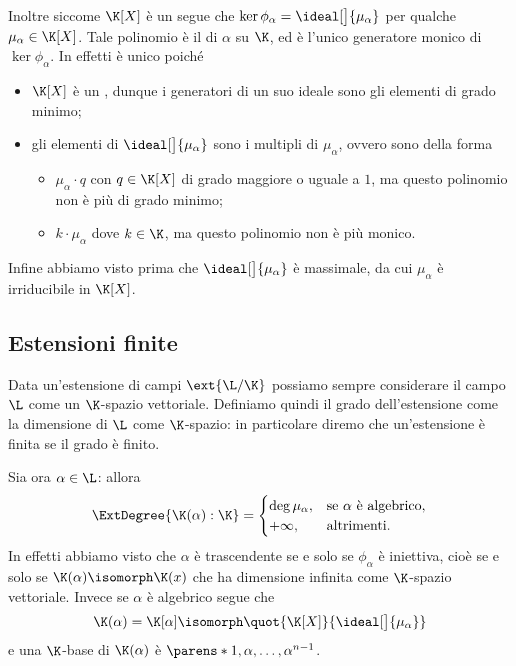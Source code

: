 Inoltre siccome $\K[X]$ è un \PID segue che $\ker \phi_\alpha = \ideal[\big]{\mu_\alpha}$ per qualche $\mu_\alpha \in \K[X]$. Tale polinomio è il  di $\alpha$ su $\K$, ed è l'unico generatore monico di $\ker \phi_\alpha$. In effetti è unico poiché \begin{itemize}
    \item $\K[X]$ è un \ED, dunque i generatori di un suo ideale sono gli elementi di grado minimo;
    \item gli elementi di $\ideal[\big]{\mu_\alpha}$ sono i multipli di $\mu_\alpha$, ovvero sono della forma \begin{itemize}
        \item $\mu_\alpha \cdot q$ con $q \in \K[X]$ di grado maggiore o uguale a $1$, ma questo polinomio non è più di grado minimo;
        \item $k\cdot\mu_\alpha$ dove $k \in \K$, ma questo polinomio non è più monico.   
    \end{itemize} 
\end{itemize}
Infine abbiamo visto prima che $\ideal[\big]{\mu_\alpha}$ è massimale, da cui $\mu_\alpha$ è irriducibile in $\K[X]$. 

\subsection*{Estensioni finite}

Data un'estensione di campi $\ext{\L / \K}$ possiamo sempre considerare il campo $\L$ come un $\K$-spazio vettoriale. Definiamo quindi il grado dell'estensione come la dimensione di $\L$ come $\K$-spazio: in particolare diremo che un'estensione è finita se il grado è finito.

Sia ora $\alpha \in \L$: allora \[
    \ExtDegree{\K(\alpha) : \K} = \begin{cases}
        \deg \mu_\alpha, &\text{se $\alpha$ è algebrico},\\
        +\infty, &\text{altrimenti}. 
    \end{cases}
\] In effetti abbiamo visto che $\alpha$ è trascendente se e solo se $\phi_\alpha$ è iniettiva, cioè se e solo se $\K(\alpha) \isomorph \K(x)$ che ha dimensione infinita come $\K$-spazio vettoriale. Invece se $\alpha$ è algebrico segue che \[
    \K(\alpha) = \K[\alpha] \isomorph \quot{\K[X]}{\ideal[\big]{\mu_\alpha}}
\] e una $\K$-base di $\K(\alpha)$ è $\parens*{1, \alpha, \dots, \alpha^{n-1}}$.  